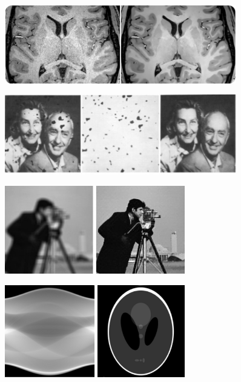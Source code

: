 \begin{frame}
\begin{figure}[h!]
\centering
\includegraphics[width=0.9\textwidth]{./Images/denoise.jpg}
\end{figure}
\pause
\begin{figure}[h!]
\centering
\includegraphics[width=0.9\textwidth]{./Images/inpaint.jpg}
\end{figure}
\end{frame}


\begin{frame}
\begin{figure}[h!]
\centering
\includegraphics[width=0.7\textwidth]{./Images/deblurr.jpg}
\end{figure}
\pause
\begin{figure}[h!]
\centering
\includegraphics[width=0.7\textwidth]{./Images/CT.png}
\end{figure}
\end{frame}

